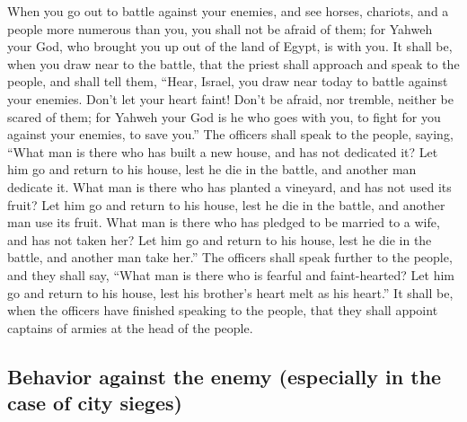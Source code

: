  When you go out to battle against your enemies, and see
horses, chariots, and a people more numerous than you, you shall not be
afraid of them; for Yahweh your God, who brought you up out of the land
of Egypt, is with you.  It shall be, when you draw near to
the battle, that the priest shall approach and speak to the people,
 and shall tell them, ``Hear, Israel, you draw near today
to battle against your enemies. Don't let your heart faint! Don't be
afraid, nor tremble, neither be scared of them;  for
Yahweh your God is he who goes with you, to fight for you against your
enemies, to save you.''  The officers shall speak to the
people, saying, ``What man is there who has built a new house, and has
not dedicated it? Let him go and return to his house, lest he die in the
battle, and another man dedicate it.  What man is there
who has planted a vineyard, and has not used its fruit? Let him go and
return to his house, lest he die in the battle, and another man use its
fruit.  What man is there who has pledged to be married to
a wife, and has not taken her? Let him go and return to his house, lest
he die in the battle, and another man take her.''  The
officers shall speak further to the people, and they shall say, ``What
man is there who is fearful and faint-hearted? Let him go and return to
his house, lest his brother's heart melt as his heart.'' 
It shall be, when the officers have finished speaking to the people,
that they shall appoint captains of armies at the head of the people.

\hypertarget{behavior-against-the-enemy-especially-in-the-case-of-city-sieges}{%
\subsection{Behavior against the enemy (especially in the case of city
sieges)}\label{behavior-against-the-enemy-especially-in-the-case-of-city-sieges}}

